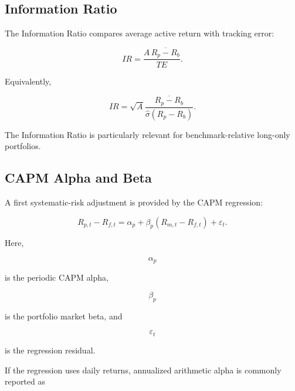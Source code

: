 \documentclass[11pt,a4paper]{article}
\begin{document}
\subsection{Information Ratio}

The Information Ratio compares average active return with tracking error:

\begin{equation}
\boxed{
IR
=
\frac{
A\,
\overline{R_p-R_b}
}{
TE
}.
}
\end{equation}

Equivalently,

\begin{equation}
\boxed{
IR
=
\sqrt{A}
\frac{
\overline{R_p-R_b}
}{
\widehat{\sigma}(R_p-R_b)
}.
}
\end{equation}

The Information Ratio is particularly relevant for benchmark-relative
long-only portfolios.


\subsection{CAPM Alpha and Beta}

A first systematic-risk adjustment is provided by the CAPM regression:

\begin{equation}
\boxed{
R_{p,t}-R_{f,t}
=
\alpha_p
+
\beta_p
\left(
R_{m,t}-R_{f,t}
\right)
+
\varepsilon_t.
}
\end{equation}

Here,

\begin{equation}
\alpha_p
\end{equation}

is the periodic CAPM alpha,

\begin{equation}
\beta_p
\end{equation}

is the portfolio market beta, and

\begin{equation}
\varepsilon_t
\end{equation}

is the regression residual.

If the regression uses daily returns, annualized arithmetic alpha is commonly
reported as
\end{document}

